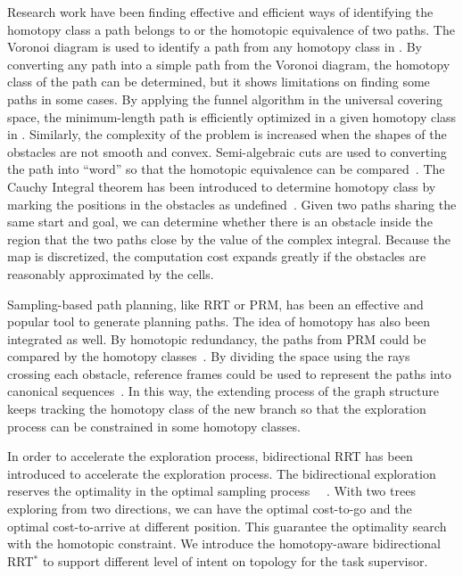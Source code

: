 \documentclass[letterpaper, 10 pt, conference]{ieeeconf}
\begin{document}
Research work have been finding effective and efficient ways of identifying the homotopy class a path belongs to or the homotopic equivalence of two paths.
The Voronoi diagram is used to identify a path from any homotopy class in \cite{banerjee2013framework}.
By converting any path into a simple path from the Voronoi diagram, the homotopy class of the path can be determined, but it shows limitations on finding some paths in some cases.
By applying the funnel algorithm in the universal covering space, the minimum-length path is efficiently optimized in a given homotopy class in \cite{Hershberger199463}.
Similarly, the complexity of the problem is increased when the shapes of the obstacles are not smooth and convex.
Semi-algebraic cuts are used to converting the path into ``word'' so that the homotopic equivalence can be compared~\cite{Grigoriev:1998:PAS:281508.281528}.
The Cauchy Integral theorem has been introduced to determine homotopy class by marking the positions in the obstacles as undefined~\cite{AAAI101920}.
Given two paths sharing the same start and goal, we can determine whether there is an obstacle inside the region that the two paths close by the value of the complex integral.
Because the map is discretized, the computation cost expands greatly if the obstacles are reasonably approximated by the cells.

Sampling-based path planning, like RRT or PRM, has been an effective and popular tool to generate planning paths.
The idea of homotopy has also been integrated as well.
By homotopic redundancy, the paths from PRM could be compared by the homotopy classes~\cite{1041613}.
By dividing the space using the rays crossing each obstacle, reference frames could be used to represent the paths into canonical sequences~\cite{Hernandez201544}.
In this way, the extending process of the graph structure keeps tracking the homotopy class of the new branch so that the exploration process can be constrained in some homotopy classes.

In order to accelerate the exploration process, bidirectional RRT has been introduced to accelerate the exploration process.
The bidirectional exploration reserves the optimality in the optimal sampling process
~\cite{Jordan.Perez.ea:CSAIL13}~\cite{starek2014bidirectional}.
With two trees exploring from two directions, we can have the optimal cost-to-go and the optimal cost-to-arrive at different position.
This guarantee the optimality search with the homotopic constraint.
We introduce the homotopy-aware bidirectional RRT$^{*}$ to support different level of intent on topology for the task supervisor.
\end{document}
